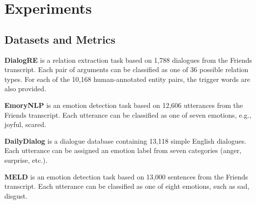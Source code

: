 
\section{Experiments}
\subsection{Datasets and Metrics}


\textbf{DialogRE} \citep{yu-etal-2020-dialogue} is a relation extraction task based on 1,788 dialogues from the Friends transcript. Each pair of arguments can be classified as one of 36 possible relation types. For each of the 10,168 human-annotated entity pairs, the trigger words are also provided. %

\textbf{EmoryNLP} \citep{zahiri:18a} is an emotion detection task based on 12,606 utterances from the Friends transcript. Each utterance can be classified as one of seven emotions, e.g., joyful, scared. 

\textbf{DailyDialog} \citep{DailyDialog} is a dialogue database containing 13,118 simple English dialogues. Each utterance can be assigned an emotion label from seven categories (anger, surprise, etc.). 

\textbf{MELD} \citep{poria-etal-2019-meld} is an emotion detection task based on 13,000 sentences from the Friends transcript. Each utterance can be classified as one of eight emotions, such as sad, disgust. %

